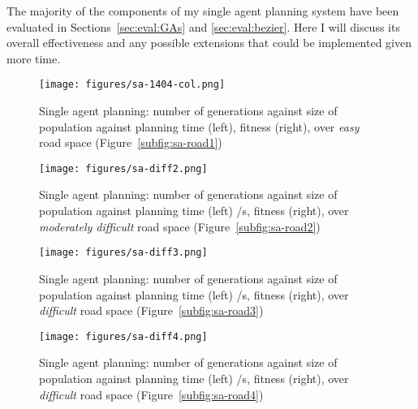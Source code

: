 The majority of the components of my single agent planning system have been evaluated in Sections~\ref{sec:eval:GAs} and \ref{sec:eval:bezier}. Here I will discuss its overall effectiveness and any possible extensions that could be implemented given more time.


\begin{figure}[ht]
  \centering
  \texttt{[image: figures/sa-1404-col.png]}
  \caption{\label{fig:sa-col} Single agent planning: number of generations against size of population against planning time (left), fitness (right), over \textit{easy} road space (Figure~\ref{subfig:sa-road1})}
\end{figure}

\begin{figure}[ht]
  \centering
  \texttt{[image: figures/sa-diff2.png]}
  \caption{\label{fig:sa-diff2} Single agent planning: number of generations against size of population against planning time (left) /s, fitness (right), over \textit{moderately difficult} road space (Figure~\ref{subfig:sa-road2})}
\end{figure}

\begin{figure}[ht]
  \centering
  \texttt{[image: figures/sa-diff3.png]}
  \caption{\label{fig:sa-diff3} Single agent planning: number of generations against size of population against planning time (left) /s, fitness (right), over \textit{difficult} road space (Figure~\ref{subfig:sa-road3})}
\end{figure}

\begin{figure}[ht]
  \centering
  \texttt{[image: figures/sa-diff4.png]}
  \caption{\label{fig:sa-diff4} Single agent planning: number of generations against size of population against planning time (left) /s, fitness (right), over \textit{difficult} road space (Figure~\ref{subfig:sa-road4})}
\end{figure}

